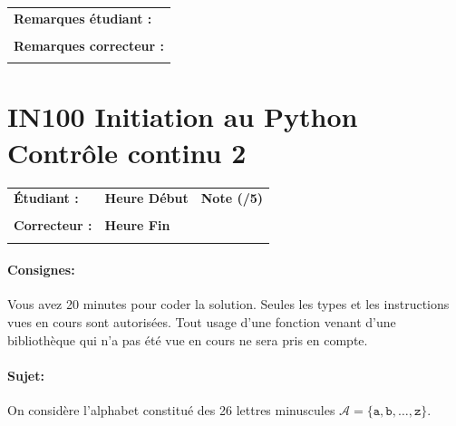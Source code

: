 \documentclass[a4paper,11pt]{article}
\begin{document}
\vspace{0.5 cm}
\begin{table}[h!]
\centering
\renewcommand{\arraystretch}{1.4} %
\begin{tabular}{|p{15cm}|}
\hline
\textbf{Remarques étudiant :}    \\
 \\
\hline
\textbf{Remarques correcteur :}  \\
 \\
\hline
\end{tabular}
\end{table}

\newpage

\section*{\center IN100 Initiation au Python\\
Contrôle continu 2}

\vspace{-0.3 cm}

\begin{table}[h!]
\centering
\renewcommand{\arraystretch}{1.4} %
\begin{tabular}{|p{10cm}|p{3cm}|p{2cm}|}
\hline
\textbf{Étudiant :} & \textbf{Heure Début }  & \textbf{Note (/5) }  \\
& & \\
\hline
\textbf{Correcteur :} & \textbf{Heure Fin } & \\
& & \\
\hline

\hline
\end{tabular}
\end{table}

\paragraph*{Consignes:} Vous avez 20 minutes pour coder la solution. Seules les types et les instructions vues en cours sont autorisées. Tout usage d'une fonction 
venant d'une bibliothèque qui n'a pas été vue en cours ne sera pris en compte. 


\paragraph*{Sujet:}


On considère l’alphabet constitué des 26 lettres minuscules $\mathcal{A} = \{\texttt{a}, \texttt{b}, \ldots, \texttt{z}\}$.
\end{document}
